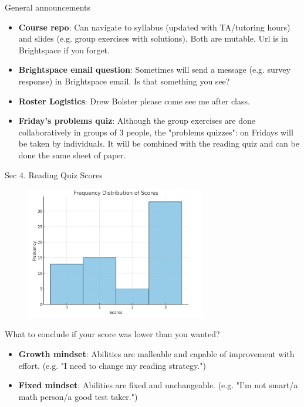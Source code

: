 \documentclass[10pt]{beamer}
\begin{document}
\begin{frame}{General announcements}
\begin{itemize}
\item \textbf{Course repo}: Can navigate to syllabus (updated with TA/tutoring hours) and slides (e.g. group exercises with solutions).  Both are mutable. Url is in Brightspace if you forget.    
\item \textbf{Brightspace email question}: Sometimes will send a message (e.g. survey response) in Brightspace email. Is that something you see?
\item \textbf{Roster Logistics}: Drew Bolster please come see me after class. 
\item \textbf{Friday's problems quiz}:  Although the group exercises are done collaboratively in groups of 3 people, the "problems quizzes": on Fridays will be taken by individuals.  It will be combined with the reading quiz and can be done the same sheet of paper.
\end{itemize}
	
\end{frame}

\begin{frame}{Sec 4. Reading Quiz Scores}

\begin{figure}
\includegraphics[width=0.7\textwidth]{images/sec4_scores.png}
\end{figure}

\footnotesize 
%
What to conclude if your score was lower than you wanted?
\begin{itemize}
\item \textbf{Growth mindset}: \greencheck  Abilities are malleable and capable of improvement with effort.  (e.g. "I need to change my reading strategy.") 
\item \textbf{Fixed mindset}: \redx  Abilities are fixed and unchangeable. (e.g. "I'm not smart/a math person/a good test taker.")	
\end{itemize}
%
\end{frame}
\end{document}
